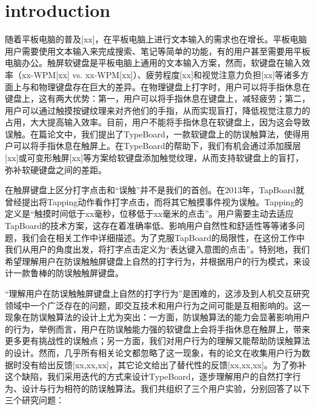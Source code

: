 \section{introduction}

随着平板电脑的普及[xx]，在平板电脑上进行文本输入的需求也在增长。平板电脑用户需要使用文本输入来完成搜索、笔记等简单的功能，有的用户甚至需要用平板电脑办公。触屏软键盘是平板电脑上通用的文本输入方案，然而，软键盘在输入效率（xx-WPM[xx] vs. xx-WPM[xx]）、疲劳程度[xx]和视觉注意力负担[xx]等诸多方面上与和物理键盘存在巨大的差异。在物理键盘上打字时，用户可以将手指休息在键盘上，这有两大优势：第一，用户可以将手指休息在键盘上，减轻疲劳；第二，用户可以通过触摸按键纹理来对齐他们的手指，从而实现盲打，降低视觉注意力的占用，大大提高输入效率。目前，用户不能将手指休息在软键盘上，因为这会导致误触。在篇论文中，我们提出了TypeBoard，一款软键盘上的防误触算法，使得用户可以将手指休息在触屏上。在TypeBoard的帮助下，我们有机会通过添加膜层[xx]或可变形触屏[xx]等方案给软键盘添加触觉纹理，从而支持软键盘上的盲打，弥补软硬键盘之间的差距。

在触屏键盘上区分打字点击和“误触”并不是我们的首创。在2013年，TapBoard就曾经提出将Tapping动作看作打字点击，而将其它触摸事件视为误触。Tapping的定义是“触摸时间低于xx毫秒，位移低于xx毫米的点击”。用户需要主动去适应TapBoard的技术方案，这存在着准确率低、影响用户自然性和舒适性等等诸多问题，我们会在相关工作中详细描述。为了克服TapBoard的局限性，在这份工作中我们从用户的角度出发，将打字点击定义为“表达键入意图的点击”。特别地，我们希望理解用户在防误触触屏键盘上自然的打字行为，并根据用户的行为模式，来设计一款鲁棒的防误触触屏键盘。

“理解用户在防误触触屏键盘上自然的打字行为”是困难的，这涉及到人机交互研究领域中一个广泛存在的问题，即交互技术和用户行为之间可能是互相影响的。这一现象在防误触算法的设计上尤为突出：一方面，防误触算法的能力会显著影响用户的行为，举例而言，用户在防误触能力强的软键盘上会将手指休息在触屏上，带来更多更有挑战性的误触点；另一方面，我们对用户行为的理解又能帮助防误触算法的设计。然而，几乎所有相关论文都忽略了这一现象，有的论文在收集用户行为数据时没有给出反馈[xx,xx,xx]，其它论文给出了替代性的反馈[xx,xx,xx]。为了弥补这个缺陷，我们采用迭代的方式来设计TypeBoard，逐步理解用户的自然打字行为、设计与行为相符的防误触算法。我们共组织了三个用户实验，分别回答了以下三个研究问题：

